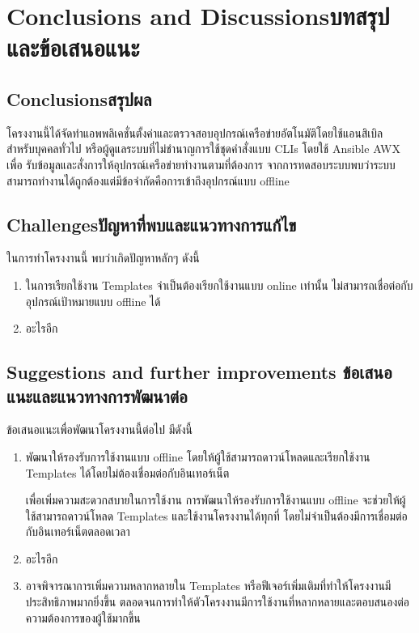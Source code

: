 \chapter{\ifenglish Conclusions and Discussions\else บทสรุปและข้อเสนอแนะ\fi}

\section{\ifenglish Conclusions\else สรุปผล\fi}

\hspace{0.5in}โครงงานนี้ได้จัดทำแอพพลิเคชั่นตั้งค่าและตรวจสอบอุปกรณ์เครือข่ายอัตโนมัติโดยใช้แอนสิเบิล
สำหรับบุคคลทั่วไป หรือผู้ดูแลระบบที่ไม่ชำนาญการใช้ชุดคำสั่งแบบ CLIs โดยใช้ Ansible AWX เพื่อ
รับข้อมูลและสั่งการให้อุปกรณ์เครือข่ายทำงานตามที่ต้องการ จากการทดสอบระบบพบว่าระบบ
สามารถทำงานได้ถูกต้องแต่มีข้อจำกัดคือการเข้าถึงอุปกรณ์แบบ offline

\section{\ifenglish Challenges\else ปัญหาที่พบและแนวทางการแก้ไข\fi}

\hspace{0.5in}ในการทำโครงงานนี้ พบว่าเกิดปัญหาหลักๆ ดังนี้
\begin{enumerate}
    \item ในการเรียกใช้งาน Templates จำเป็นต้องเรียกใช้งานแบบ online เท่านั้น ไม่สามารถเชื่อต่อกับอุปกรณ์เป้าหมายแบบ offline ได้
    \item อะไรอีก
  \end{enumerate}
\section{\ifenglish%
Suggestions and further improvements
\else%
ข้อเสนอแนะและแนวทางการพัฒนาต่อ
\fi
}

\hspace{0.5in}ข้อเสนอแนะเพื่อพัฒนาโครงงานนี้ต่อไป มีดังนี้

\hspace{0.5in}\begin{enumerate}
    \item พัฒนาให้รองรับการใช้งานแบบ offline โดยให้ผู้ใช้สามารถดาวน์โหลดและเรียกใช้งาน Templates ได้โดยไม่ต้องเชื่อมต่อกับอินเทอร์เน็ต

    \hspace{0.5in}เพื่อเพิ่มความสะดวกสบายในการใช้งาน การพัฒนาให้รองรับการใช้งานแบบ offline จะช่วยให้ผู้ใช้สามารถดาวน์โหลด Templates และใช้งานโครงงานได้ทุกที่ โดยไม่จำเป็นต้องมีการเชื่อมต่อกับอินเทอร์เน็ตตลอดเวลา

    \item อะไรอีก

    \hspace{0.5in}\item อาจพิจารณาการเพิ่มความหลากหลายใน Templates หรือฟีเจอร์เพิ่มเติมที่ทำให้โครงงานมีประสิทธิภาพมากยิ่งขึ้น ตลอดจนการทำให้ตัวโครงงานมีการใช้งานที่หลากหลายและตอบสนองต่อความต้องการของผู้ใช้มากขึ้น
\end{enumerate}

